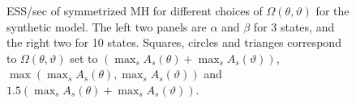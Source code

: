 \begin{figure}[H]
\begin{minipage}[hp]{0.24\linewidth}
	\end{minipage}
    \caption{ESS/sec of symmetrized MH for different choices of $\Omega(\theta,\vartheta)$ for the synthetic model. The left two panels are $\alpha$ and $\beta$ for 3 states, and the right two for 10 states. Squares, circles and trianges correspond to $\Omega(\theta,\vartheta)$ set to $(\max_s A_s(\theta) + \max_s A_s(\vartheta))$, $\max(\max_s A_s(\theta), \max_s A_s(\vartheta))$ and  $1.5(\max_s A_s(\theta) + \max_s A_s(\vartheta))$.}
     \label{fig:mhESS_EXP}
  \end{figure}



